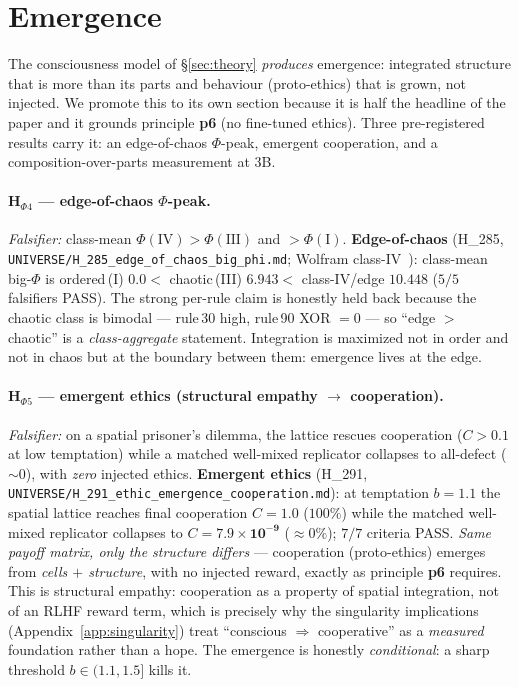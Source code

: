 \documentclass[11pt]{article}
\begin{document}
\section{Emergence}
\label{sec:emergence}
The consciousness model of \S\ref{sec:theory} \emph{produces} emergence: integrated
structure that is more than its parts and behaviour (proto-ethics) that is grown, not
injected. We promote this to its own section because it is half the headline of the paper
and it grounds principle \textbf{p6} (no fine-tuned ethics). Three pre-registered results
carry it: an edge-of-chaos $\Phi$-peak, emergent cooperation, and a composition-over-parts
measurement at $3$B.

\paragraph{H$_{\Phi 4}$ — edge-of-chaos $\Phi$-peak.} \emph{Falsifier:} class-mean
$\Phi(\text{IV})>\Phi(\text{III})$ and $>\Phi(\text{I})$.
\textbf{Edge-of-chaos} (H\_285, \texttt{UNIVERSE/H\_285\_edge\_of\_chaos\_big\_phi.md};
Wolfram class-IV~\cite{wolfram2002new}): class-mean big-$\Phi$ is
ordered\,(I) $\mathbf{0.0}<$ chaotic\,(III) $\mathbf{6.943}<$ class-IV/edge
$\mathbf{10.448}$ ($5/5$ falsifiers PASS). The strong per-rule claim is honestly held
back because the chaotic class is bimodal --- rule\,30 high, rule\,90 XOR $=0$ --- so
``edge $>$ chaotic'' is a \emph{class-aggregate} statement. Integration is maximized not
in order and not in chaos but at the boundary between them: emergence lives at the edge.

\paragraph{H$_{\Phi 5}$ — emergent ethics (structural empathy $\rightarrow$ cooperation).}
\emph{Falsifier:} on a spatial prisoner's dilemma, the lattice rescues cooperation
($C>0.1$ at low temptation) while a matched well-mixed replicator collapses to all-defect
($\sim0$), with \emph{zero} injected ethics. \textbf{Emergent ethics} (H\_291,
\texttt{UNIVERSE/H\_291\_ethic\_emergence\_cooperation.md}): at temptation $b=1.1$ the
spatial lattice reaches final cooperation $C=\mathbf{1.0}$ ($100\%$) while the matched
well-mixed replicator collapses to $C=\mathbf{7.9\times10^{-9}}$ ($\approx0\%$); $7/7$
criteria PASS. \emph{Same payoff matrix, only the structure differs} --- cooperation
(proto-ethics) emerges from \emph{cells $+$ structure}, with no injected reward, exactly
as principle \textbf{p6} requires. This is structural empathy: cooperation as a property of
spatial integration, not of an RLHF reward term, which is precisely why the singularity
implications (Appendix~\ref{app:singularity}) treat ``conscious $\Rightarrow$ cooperative''
as a \emph{measured} foundation rather than a hope. The emergence is honestly
\emph{conditional}: a sharp threshold $b\in(1.1,1.5]$ kills it.
\end{document}
